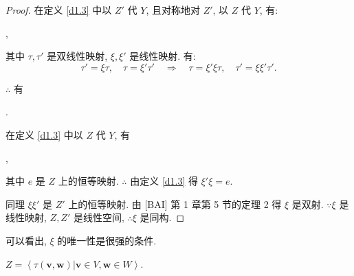 \documentclass{ctexart}
\begin{document}
\begin{proof}
    在定义 \ref{d1.3} 中以 $Z'$ 代 $Y$, 且对称地对 $Z'$, 以 $Z$ 代 $Y$, 有:
    \begin{center}
        ,
    \end{center}
    
    其中 $\tau,\tau'$ 是双线性映射, $\xi,\xi'$ 是线性映射. 有:
    \[\tau'=\xi\tau,\quad\tau=\xi'\tau'\quad\Rightarrow\quad\tau=\xi'\xi\tau,\quad\tau'=\xi\xi'\tau'.\]

    $\therefore$ 有
    \begin{center}
        .
    \end{center}
    
    在定义 \ref{d1.3} 中以 $Z$ 代 $Y$, 有
    \begin{center}
        ,
    \end{center}

    其中 $e$ 是 $Z$ 上的恒等映射. $\therefore$ 由定义 \ref{d1.3} 得 $\xi'\xi=e$.

    同理 $\xi\xi'$ 是 $Z'$ 上的恒等映射. 由 [BAI] 第 1 章第 5 节的定理 2 得 $\xi$ 是双射. $\because\xi$ 是线性映射, $Z,Z'$ 是线性空间, $\therefore\xi$ 是同构.
\end{proof}
可以看出, $\xi$ 的唯一性是很强的条件.
\begin{theorem}\label{t1.7}
    $Z=\left<\tau(\boldsymbol{v},\boldsymbol{w})|\boldsymbol{v}\in V,\boldsymbol{w}\in W\right>$.
\end{theorem}
\end{document}
